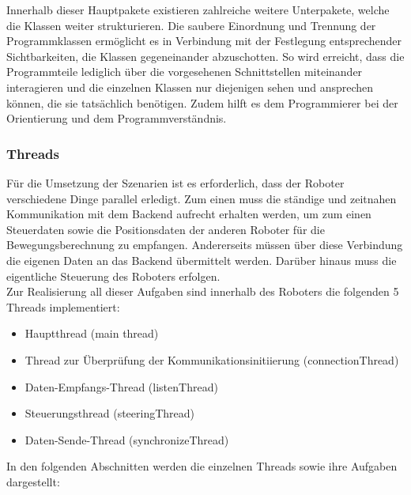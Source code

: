 Innerhalb dieser Hauptpakete existieren zahlreiche weitere Unterpakete, welche die Klassen weiter strukturieren. Die saubere Einordnung
und Trennung der Programmklassen ermöglicht es in Verbindung mit der Festlegung entsprechender Sichtbarkeiten, die Klassen gegeneinander 
abzuschotten. So wird erreicht, dass die Programmteile lediglich über die vorgesehenen Schnittstellen miteinander interagieren und die
einzelnen Klassen nur diejenigen sehen und ansprechen können, die sie tatsächlich benötigen. Zudem hilft es dem Programmierer bei der 
Orientierung und dem Programmverständnis.
\subsubsection{Threads}
Für die Umsetzung der Szenarien ist es erforderlich, dass der Roboter verschiedene Dinge parallel erledigt. Zum einen muss die 
ständige und zeitnahen Kommunikation mit dem Backend aufrecht erhalten werden, um zum einen Steuerdaten sowie die Positionsdaten
der anderen Roboter für die Bewegungsberechnung zu empfangen. Andererseits müssen über diese Verbindung die eigenen Daten an das Backend übermittelt werden. Darüber hinaus muss die eigentliche Steuerung des Roboters erfolgen. \\
Zur Realisierung all dieser Aufgaben sind innerhalb des Roboters die folgenden 5 Threads implementiert:
\begin{itemize}
	\item{Hauptthread (main thread)}
	\item{Thread zur Überprüfung der Kommunikationsinitiierung (connectionThread)}
	\item{Daten-Empfangs-Thread (listenThread)}
	\item{Steuerungsthread (steeringThread)}
	\item{Daten-Sende-Thread (synchronizeThread)}
\end{itemize}
In den folgenden Abschnitten werden die einzelnen Threads sowie ihre Aufgaben dargestellt:
